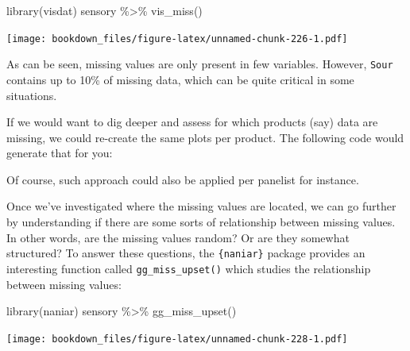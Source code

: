 \documentclass[
]{krantz}
\makeatletter
\newenvironment{Shaded}{\begin{snugshade}}{\end{snugshade}}
\newcommand{\ControlFlowTok}[1]{\textcolor[rgb]{0.27,0.27,0.27}{\textbf{#1}}}
\newcommand{\FunctionTok}[1]{\textcolor[rgb]{0,0,0}{#1}}
\newcommand{\NormalTok}[1]{#1}
\newcommand{\SpecialCharTok}[1]{\textcolor[rgb]{0,0,0}{#1}}
\newenvironment{kframe}{%
\medskip{}
\setlength{\fboxsep}{.8em}
 \def\at@end@of@kframe{}%
 \ifinner\ifhmode%
  \def\at@end@of@kframe{\end{minipage}}%
  \begin{minipage}{\columnwidth}%
 \fi\fi%
 \def\FrameCommand##1{\hskip\@totalleftmargin \hskip-\fboxsep
 \colorbox{shadecolor}{##1}\hskip-\fboxsep
     \hskip-\linewidth \hskip-\@totalleftmargin \hskip\columnwidth}%
 \MakeFramed {\advance\hsize-\width
   \@totalleftmargin\z@ \linewidth\hsize
   \@setminipage}}%
 {\par\unskip\endMakeFramed%
 \at@end@of@kframe}
\renewenvironment{Shaded}{\begin{kframe}}{\end{kframe}}
\makeatother
\begin{document}
\begin{Shaded}
\begin{Highlighting}[]
\FunctionTok{library}\NormalTok{(visdat)}
\NormalTok{sensory }\SpecialCharTok{\%\textgreater{}\%} 
  \FunctionTok{vis\_miss}\NormalTok{()}
\end{Highlighting}
\end{Shaded}

\texttt{[image: bookdown\_files/figure-latex/unnamed-chunk-226-1.pdf]}

As can be seen, missing values are only present in few variables. However, \texttt{Sour} contains up to 10\% of missing data, which can be quite critical in some situations.

If we would want to dig deeper and assess for which products (say) data are missing, we could re-create the same plots per product. The following code would generate that for you:

\begin{Shaded}
\end{Shaded}

Of course, such approach could also be applied per panelist for instance.

Once we've investigated where the missing values are located, we can go further by understanding if there are some sorts of relationship between missing values. In other words, are the missing values random? Or are they somewhat structured?
To answer these questions, the \texttt{\{naniar\}} package provides an interesting function called \texttt{gg\_miss\_upset()} which studies the relationship between missing values:

\begin{Shaded}
\begin{Highlighting}[]
\FunctionTok{library}\NormalTok{(naniar)}
\NormalTok{sensory }\SpecialCharTok{\%\textgreater{}\%}
  \FunctionTok{gg\_miss\_upset}\NormalTok{()}
\end{Highlighting}
\end{Shaded}

\texttt{[image: bookdown\_files/figure-latex/unnamed-chunk-228-1.pdf]}
\end{document}
